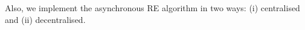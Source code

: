 \documentclass{rspublic}
\newcommand{\alnote}[1]{ {\textcolor{blue} { ***andre: #1 }}}
\newcommand{\athotanote}[1]{ {\textcolor{green} { ***athota: #1 }}}
\newcommand{\alnote}[1]{}
\newcommand{\athotanote}[1]{}
\begin{document}



Also, we implement the asynchronous RE algorithm in two ways: (i) centralised and (ii) decentralised.
\end{document}
